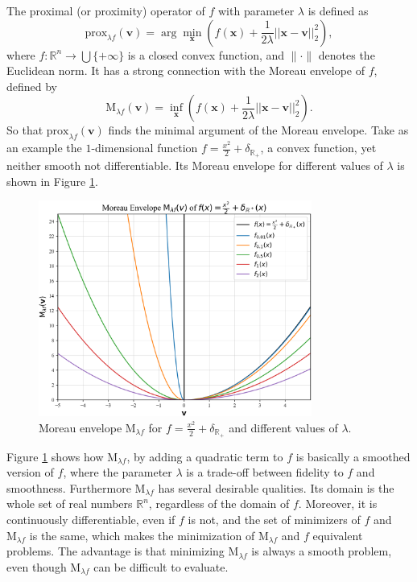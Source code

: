 The proximal (or proximity) operator \cite{parikh_proximal_2014} of $f$ with parameter $\lambda$ is defined as
\begin{equation}
\mathrm{prox}_{\lambda f}(\mathbf{v}) = \arg \min_{\mathbf{x}}(f(\mathbf{x})+\frac{1}{2\lambda}||\mathbf{x} - \mathbf{v}||_2^2),
\label{eq:prox}
\end{equation}
where $f: \mathbb{R}^n \rightarrow \bigcup \{+\infty \}$ is a closed convex function, and $\| \cdot \|$ denotes the Euclidean norm. It has a strong connection with the Moreau envelope of $f$, defined by
\begin{equation}
\mathrm{M}_{\lambda f}(\mathbf{v}) = \inf_{\mathbf{x}}(f(\mathbf{x})+\frac{1}{2\lambda}||\mathbf{x} - \mathbf{v}||_2^2).
\label{eq:moreau}
\end{equation}
So that $\mathrm{prox}_{\lambda f}(\mathbf{v})$ finds the minimal argument of the Moreau envelope. Take as an example the $1$-dimensional function $f = \frac{x^2}{2} + \delta_{\mathbb{R}_+}$, a convex function, yet neither smooth not differentiable. Its Moreau envelope for different values of $\lambda$ is shown in Figure \ref{fig:moreau_envelope}.
\begin{figure}[H]
  \begin{center}
  \includegraphics[width = 0.8\textwidth]{images/M_envelope.PNG}
  \caption{Moreau envelope $\mathrm{M}_{\lambda f}$ for $f = \frac{x^2}{2} + \delta_{\mathbb{R}_+}$ and different values of $\lambda$.} 
  \label{fig:moreau_envelope}
  \end{center}
\end{figure}

Figure \ref{fig:moreau_envelope} shows how $\mathrm{M}_{\lambda f}$, by adding a quadratic term to $f$ is basically a smoothed version of $f$, where the parameter $\lambda$ is a trade-off between fidelity to $f$ and smoothness. Furthermore $\mathrm{M}_{\lambda f}$ has several desirable qualities. Its domain is the whole set of real numbers $\mathbb{R}^n$, regardless of the domain of $f$. Moreover, it is continuously differentiable, even if $f$ is not, and the set of minimizers of $f$ and $\mathrm{M}_{\lambda f}$ is the same, which makes the minimization of $\mathrm{M}_{\lambda f}$ and $f$ equivalent problems. The advantage is that minimizing $\mathrm{M}_{\lambda f}$ is always a smooth problem, even though $\mathrm{M}_{\lambda f}$ can be difficult to evaluate. 

